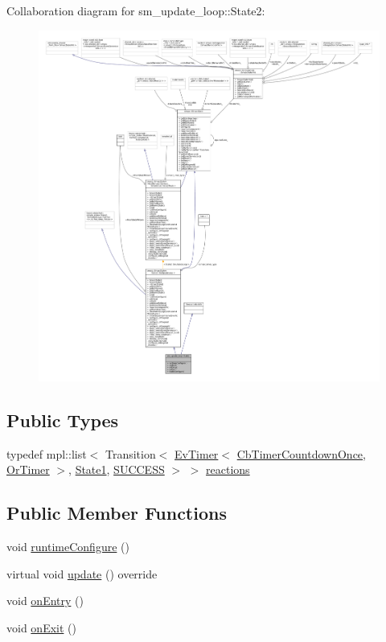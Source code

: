 Collaboration diagram for sm\+\_\+update\+\_\+loop\+:\+:State2\+:
\nopagebreak
\begin{figure}[H]
\begin{center}
\leavevmode
\includegraphics[width=350pt]{structsm__update__loop_1_1State2__coll__graph}
\end{center}
\end{figure}
\subsection*{Public Types}
\begin{DoxyCompactItemize}
\item 
typedef mpl\+::list$<$ Transition$<$ \hyperlink{structcl__ros__timer_1_1EvTimer}{Ev\+Timer}$<$ \hyperlink{classcl__ros__timer_1_1CbTimerCountdownOnce}{Cb\+Timer\+Countdown\+Once}, \hyperlink{classsm__update__loop_1_1OrTimer}{Or\+Timer} $>$, \hyperlink{structsm__update__loop_1_1State1}{State1}, \hyperlink{structsmacc_1_1default__transition__tags_1_1SUCCESS}{S\+U\+C\+C\+E\+SS} $>$ $>$ \hyperlink{structsm__update__loop_1_1State2_a568e8e1054b11a61f72133866608b392}{reactions}
\end{DoxyCompactItemize}
\subsection*{Public Member Functions}
\begin{DoxyCompactItemize}
\item 
void \hyperlink{structsm__update__loop_1_1State2_ad817c7ed319628e2794a05bb6aa10921}{runtime\+Configure} ()
\item 
virtual void \hyperlink{structsm__update__loop_1_1State2_aab947246406d3225de2f83f336ae24a3}{update} () override
\item 
void \hyperlink{structsm__update__loop_1_1State2_aad753f0a0db2bc8ee2d3a607d6a14c30}{on\+Entry} ()
\item 
void \hyperlink{structsm__update__loop_1_1State2_ae395dcf34ef756a9039d8f71b2d05244}{on\+Exit} ()
\end{DoxyCompactItemize}

